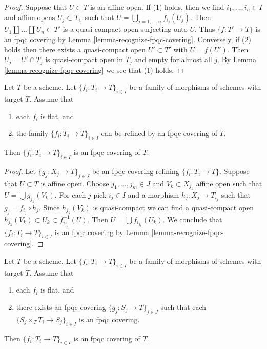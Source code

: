 \begin{proof}
Suppose that $U \subset T$ is an affine open. If (1) holds, then we find
$i_1, \ldots, i_n \in I$ and affine opens $U_j \subset T_{i_j}$ such that
$U = \bigcup_{j = 1, \ldots, n} f_{i_j}(U_j)$. Then
$U_1 \amalg \ldots \amalg U_n \subset T'$ is a quasi-compact open surjecting
onto $U$. Thus $\{f : T' \to T\}$ is an fpqc covering by
Lemma \ref{lemma-recognize-fpqc-covering}.
Conversely, if (2) holds then there exists a quasi-compact open
$U' \subset T'$ with $U = f(U')$. Then $U_j = U' \cap T_j$ is quasi-compact
open in $T_j$ and empty for almost all $j$. By
Lemma \ref{lemma-recognize-fpqc-covering} we see that (1) holds.
\end{proof}

\begin{lemma}
\label{lemma-family-flat-dominated-covering}
Let $T$ be a scheme. Let $\{f_i : T_i \to T\}_{i \in I}$ be a family of
morphisms of schemes with target $T$. Assume that
\begin{enumerate}
\item each $f_i$ is flat, and
\item the family $\{f_i : T_i \to T\}_{i \in I}$ can be refined by an
fpqc covering of $T$.
\end{enumerate}
Then $\{f_i : T_i \to T\}_{i \in I}$ is an fpqc covering of $T$.
\end{lemma}

\begin{proof}
Let $\{g_j : X_j \to T\}_{j \in J}$ be an fpqc covering refining
$\{f_i : T_i \to T\}$. Suppose that $U \subset T$ is affine open.
Choose $j_1, \ldots, j_m \in J$ and $V_k \subset X_{j_k}$ affine
open such that $U = \bigcup g_{j_k}(V_k)$. For each $j$ pick $i_j \in I$
and a morphism $h_j : X_j \to T_{i_j}$ such that $g_j = f_{i_j} \circ h_j$.
Since $h_{j_k}(V_k)$ is quasi-compact we can find a quasi-compact
open $h_{j_k}(V_k) \subset U_k \subset f_{i_{j_k}}^{-1}(U)$.
Then $U = \bigcup f_{i_{j_k}}(U_k)$. We conclude that
$\{f_i : T_i \to T\}_{i \in I}$ is an fpqc covering by
Lemma \ref{lemma-recognize-fpqc-covering}.
\end{proof}

\begin{lemma}
\label{lemma-family-flat-fpqc-local-covering}
Let $T$ be a scheme. Let $\{f_i : T_i \to T\}_{i \in I}$ be a family of
morphisms of schemes with target $T$. Assume that
\begin{enumerate}
\item each $f_i$ is flat, and
\item there exists an fpqc covering
$\{g_j : S_j \to T\}_{j \in J}$ such that each
$\{S_j \times_T T_i \to S_j\}_{i \in I}$ is an fpqc covering.
\end{enumerate}
Then $\{f_i : T_i \to T\}_{i \in I}$ is an fpqc covering of $T$.
\end{lemma}

